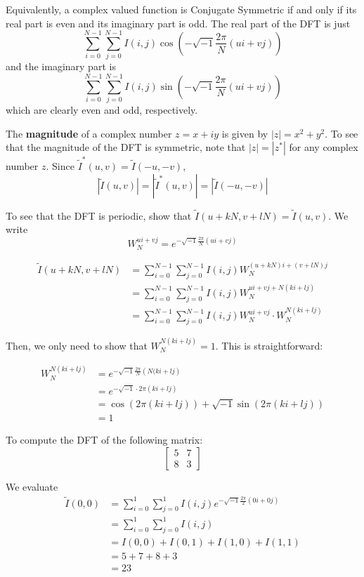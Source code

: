 \documentclass[a4paper]{article}
\begin{document}
Equivalently, a complex valued function is Conjugate Symmetric if and only if its real part is even and its imaginary part is odd. The real part of the DFT is just \[\sum_{i=0}^{N-1}\sum_{j=0}^{N-1}I(i, j)\cos{\left(-\sqrt{-1}\frac{2\pi}{N}\left(ui+vj\right)\right)}\] and the imaginary part is \[\sum_{i=0}^{N-1}\sum_{j=0}^{N-1}I(i, j)\sin{\left(-\sqrt{-1}\frac{2\pi}{N}\left(ui+vj\right)\right)}\] which are clearly even and odd, respectively.

The \textbf{magnitude} of a complex number $z=x+iy$ is given by $|z|=x^2+y^2$. To see that the magnitude of the DFT is symmetric, note that $|z|=|z^*|$ for any complex number $z$. Since $\tilde{I}^*(u, v)=\tilde{I}(-u, -v)$, \[\left|\tilde{I}(u, v)\right|=\left|\tilde{I}^*(u, v)\right|=\left|\tilde{I}(-u, -v)\right|\]

To see that the DFT is periodic, show that $\tilde{I}(u+kN,v+lN)=\tilde{I}(u,v)$. We write \[W_N^{ui+vj}=e^{-\sqrt{-1}\frac{2\pi}{N}\left(ui+vj\right)}\]

\begin{align*}
 \tilde{I}(u+kN, v+lN)&=\sum_{i=0}^{N-1}\sum_{j=0}^{N-1}I(i, j)W_N^{(u+kN)i+(v+lN)j}
		\\&=\sum_{i=0}^{N-1}\sum_{j=0}^{N-1}I(i, j)W_N^{ui+vj+N(ki+lj)}
		\\&=\sum_{i=0}^{N-1}\sum_{j=0}^{N-1}I(i, j)W_N^{ui+vj}\cdot W_N^{N(ki+lj)}
\end{align*}

Then, we only need to show that $W_N^{N(ki+lj)}=1$. This is straightforward:

\begin{align*}
W_N^{N(ki+lj)}&=e^{-\sqrt{-1}\frac{2\pi}{N}\left(N(ki+lj\right)}
	    \\&=e^{-\sqrt{-1}\cdot2\pi\left(ki+lj\right)}
	    \\&=\cos\left(2\pi(ki+lj)\right)+\sqrt{-1}\sin\left(2\pi(ki+lj)\right)
	    \\&=1
\end{align*}

To compute the DFT of the following matrix: \[\begin{bmatrix}5&7\\8&3\end{bmatrix}\]

We evaluate \begin{align*}
	     \tilde{I}(0,0)&=\sum_{i=0}^1\sum_{j=0}^{1}I(i, j)e^{-\sqrt{-1}\frac{2\pi}{2}\left(0i + 0j\right)}
			 \\&=\sum_{i=0}^1\sum_{j=0}^{1}I(i,j)
			 \\&=I(0,0)+I(0,1)+I(1, 0)+I(1,1)
			 \\&=5+7+8+3
			 \\&=23
	    \end{align*}
	    
\end{document}

